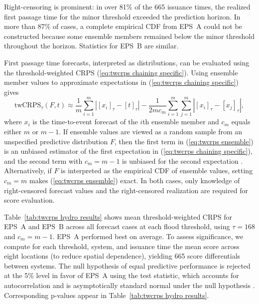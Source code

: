 \documentclass[10pt]{article} %
\theoremstyle{theorem}
\theoremstyle{definition}
\newcommand{\twCRPS}{\mathrm{twCRPS}}
\begin{document}
Right-censoring is prominent: in over 81\% of the 665 issuance times, the realized first passage time for the minor threshold exceeded the prediction horizon. In more than 87\% of cases, a complete empirical CDF from EPS~A could not be constructed because some ensemble members remained below the minor threshold throughout the horizon. Statistics for EPS~B are similar.

First passage time forecasts, interpreted as distributions, can be evaluated using the threshold-weighted CRPS (\ref{eq:twcrps chaining specific}). Using ensemble member values to approximate expectations in (\ref{eq:twcrps chaining specific}) gives
\begin{equation}\label{eq:twcrps ensemble}
\twCRPS_\tau(F,t) \approx \frac{1}{m}\sum_{i=1}^m \left|[x_i]_\tau-[t]_\tau\right| - \frac{1}{2m c_m}\sum_{i=1}^m\sum_{j=1}^m \left|[x_i]_\tau - [x_j]_\tau\right|,
\end{equation}
where $x_i$ is the time-to-event forecast of the $i$th ensemble member and $c_m$ equals either $m$ or $m-1$. If ensemble values are viewed as a random sample from an unspecified predictive distribution $F$, then the first term in (\ref{eq:twcrps ensemble}) is an unbiased estimator of the first expectation in (\ref{eq:twcrps chaining specific}), and the second term with $c_m=m-1$ is unbiased for the second expectation \citep{ferro2014fair}. Alternatively, if $F$ is interpreted as the empirical CDF of ensemble values, setting $c_m=m$ makes (\ref{eq:twcrps ensemble}) exact. In both cases, only knowledge of right-censored forecast values and the right-censored realization are required for score evaluation.

Table~\ref{tab:twcrps hydro results} shows mean threshold-weighted CRPS for EPS~A and EPS~B across all forecast cases at each flood threshold, using $\tau=168$ and $c_m=m-1$. EPS~A performed best on average. To assess significance, we compute for each threshold, system, and issuance time the mean score across eight locations (to reduce spatial dependence), yielding 665 score differentials between systems. The null hypothesis of equal predictive performance is rejected at the 5\% level in favor of EPS~A using the \cite{hering2011comparing} test statistic, which accounts for autocorrelation and is asymptotically standard normal under the null hypothesis \citep{diebold2002comparing}. Corresponding p-values appear in Table~\ref{tab:twcrps hydro results}.
\end{document}
